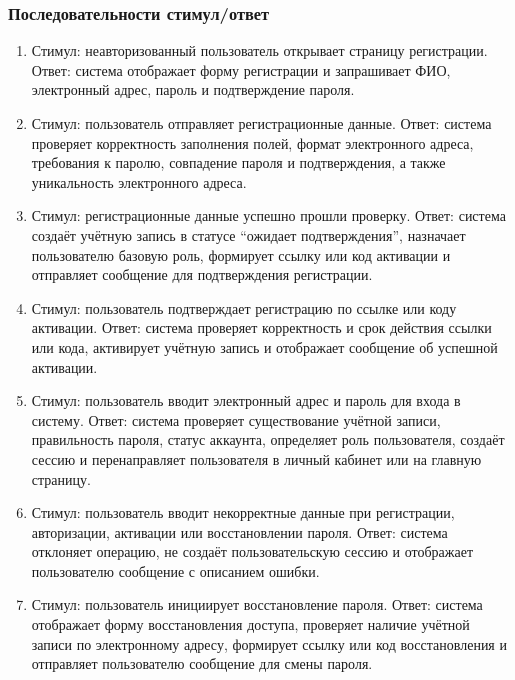 \documentclass[12pt,a4paper]{article}
\begin{document}
	\subsubsection{Последовательности стимул/ответ} 
	\begin{enumerate} 
		\item Стимул: неавторизованный пользователь открывает страницу регистрации. 
		Ответ: система отображает форму регистрации и запрашивает ФИО, электронный адрес, пароль и подтверждение пароля. 
		
		\item Стимул: пользователь отправляет регистрационные данные. 
		Ответ: система проверяет корректность заполнения полей, формат электронного адреса, требования к паролю, совпадение пароля и подтверждения, а также уникальность электронного адреса. 
		
		\item Стимул: регистрационные данные успешно прошли проверку. 
		Ответ: система создаёт учётную запись в статусе ``ожидает подтверждения'', назначает пользователю базовую роль, формирует ссылку или код активации и отправляет сообщение для подтверждения регистрации. 
		
		\item Стимул: пользователь подтверждает регистрацию по ссылке или коду активации. 
		Ответ: система проверяет корректность и срок действия ссылки или кода, активирует учётную запись и отображает сообщение об успешной активации. 
		
		\item Стимул: пользователь вводит электронный адрес и пароль для входа в систему. 
		Ответ: система проверяет существование учётной записи, правильность пароля, статус аккаунта, определяет роль пользователя, создаёт сессию и перенаправляет пользователя в личный кабинет или на главную страницу. 
		
		\item Стимул: пользователь вводит некорректные данные при регистрации, авторизации, активации или восстановлении пароля. 
		Ответ: система отклоняет операцию, не создаёт пользовательскую сессию и отображает пользователю сообщение с описанием ошибки.
		
		\item Стимул: пользователь инициирует восстановление пароля. 
		Ответ: система отображает форму восстановления доступа, проверяет наличие учётной записи по электронному адресу, формирует ссылку или код восстановления и отправляет пользователю сообщение для смены пароля. 
	\end{enumerate}
	
\end{document}
